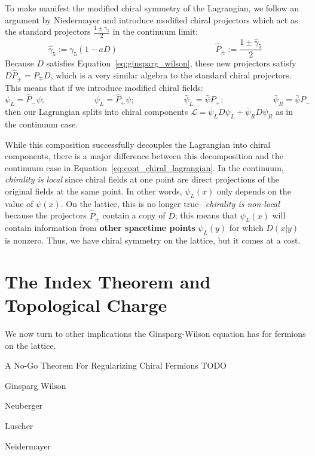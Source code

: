 \documentclass[11pt, oneside]{article}   	%
\theoremstyle{definition}
\begin{document}
To make manifest the modified chiral symmetry of the Lagrangian, we follow an argument by Niedermayer \cite{niedermayer} 
and introduce modified chiral projectors which act as the standard projectors $\frac{1\pm\gamma_5}{2}$ in the continuum limit:
\begin{equation}
	\hat\gamma_5 := \gamma_5 (1 - a D)\;\;\;\;\;\;\;\;\;\;\;\;\;\;\;\;\;\;\;\;\;\;\;\;\;\;\;\;\;\;\;\;\;\;\;\;\;\;\;\;\;\; \hat P_\pm := 
	\frac{1\pm\hat\gamma_5}{2}
\end{equation}
Because $D$ satisfies Equation~\ref{eq:ginsparg_wilson}, these new projectors satisfy $D\hat P_\pm = P_\mp D$, which is a 
very similar algebra to the standard chiral projectors. This means that if we introduce modified chiral fields:
\begin{equation}
	\psi_L = \hat P_-\psi ;\;\;\;\;\;\;\;\;\;\;\;\;\;\;\;\;\;\;\;\;\; \psi_L = \hat P_+\psi ;\;\;\;\;\;\;\;\;\;\;\;\;\;\;\;\;\;\;\;\;\; \bar\psi_L = \bar\psi 
	P_+ ;\;\;\;\;\;\;\;\;\;\;\;\;\;\;\;\;\;\;\;\;\; \bar\psi_R = \bar\psi P_-
\end{equation}
then our Lagrangian splits into chiral components $\mathcal L = \bar\psi_L D\psi_L + \bar\psi_R D\psi_R$ as in the continuum 
case. 

While this composition successfully decouples the Lagrangian into chiral components, there is a major difference between 
this decomposition and the continuum case in Equation~\ref{eq:cont_chiral_lagrangian}. In the continuum, \textit{chirality is 
local} since chiral fields at one point are direct projections of the original fields at the same point. In other words, $\psi_L(x)$ 
only depends on the value of $\psi(x)$. On the lattice, this is no longer true-- \textit{chirality is non-local} because the projectors 
$\hat P_\pm$ contain a copy of $D$; this means that $\psi_L(x)$ will contain information from \textbf{other spacetime points} 
$\psi_L(y)$ for which $D(x | y)$ is nonzero. Thus, we have chiral symmetry on the lattice, but it comes at a cost. 


\section{The Index Theorem and Topological Charge}

We now turn to other implications the Ginsparg-Wilson equation has for fermions on the lattice. 


\newpage
\begin{thebibliography}{99}

	A No-Go Theorem For Regularizing Chiral Fermions TODO
	
	Ginsparg Wilson
	
	Neuberger
	
	Luscher
	
	Neidermayer

\end{thebibliography}
\end{document}
